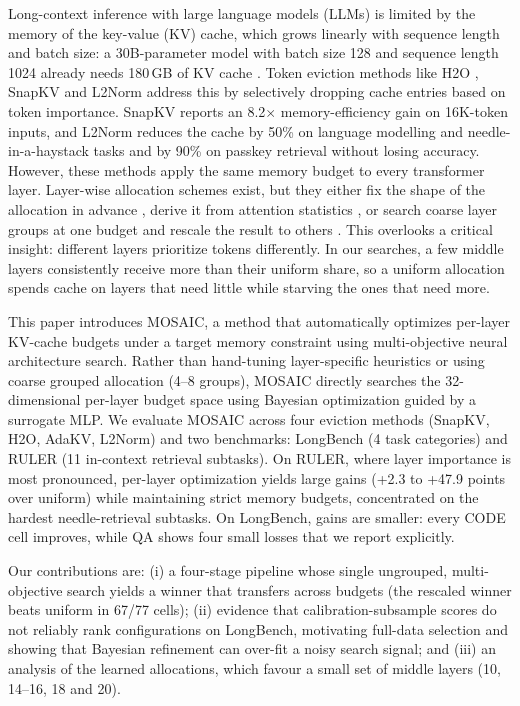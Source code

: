 \documentclass[11pt]{article}
\begin{document}
Long-context inference with large language models (LLMs) is limited by the memory of the key-value (KV) cache, which grows linearly with sequence length and batch size: a 30B-parameter model with batch size 128 and sequence length 1024 already needs 180\,GB of KV cache \citep{zhang2023h2o}. Token eviction methods like H2O \citep{zhang2023h2o}, SnapKV \citep{li2024snapkv} and L2Norm \citep{devoto2024l2norm} address this by selectively dropping cache entries based on token importance. SnapKV reports an 8.2$\times$ memory-efficiency gain on 16K-token inputs, and L2Norm reduces the cache by 50\% on language modelling and needle-in-a-haystack tasks and by 90\% on passkey retrieval without losing accuracy. However, these methods apply the same memory budget to every transformer layer. Layer-wise allocation schemes exist, but they either fix the shape of the allocation in advance \citep{cai2025pyramidkv}, derive it from attention statistics \citep{qin2025cake}, or search coarse layer groups at one budget and rescale the result to others \citep{yu2025evolkv}. This overlooks a critical insight: different layers prioritize tokens differently. In our searches, a few middle layers consistently receive more than their uniform share, so a uniform allocation spends cache on layers that need little while starving the ones that need more.

This paper introduces MOSAIC, a method that automatically optimizes per-layer KV-cache budgets under a target memory constraint using multi-objective neural architecture search. Rather than hand-tuning layer-specific heuristics or using coarse grouped allocation (4–8 groups), MOSAIC directly searches the 32-dimensional per-layer budget space using Bayesian optimization guided by a surrogate MLP. We evaluate MOSAIC across four eviction methods (SnapKV, H2O, AdaKV, L2Norm) and two benchmarks: LongBench (4 task categories) and RULER (11 in-context retrieval subtasks). On RULER, where layer importance is most pronounced, per-layer optimization yields large gains (+2.3 to +47.9 points over uniform) while maintaining strict memory budgets, concentrated on the hardest needle-retrieval subtasks. On LongBench, gains are smaller: every CODE cell improves, while QA shows four small losses that we report explicitly.

Our contributions are: (i) a four-stage pipeline whose single ungrouped, multi-objective search yields a winner that transfers across budgets (the rescaled winner beats uniform in 67/77 cells); (ii) evidence that calibration-subsample scores do not reliably rank configurations on LongBench, motivating full-data selection and showing that Bayesian refinement can over-fit a noisy search signal; and (iii) an analysis of the learned allocations, which favour a small set of middle layers (10, 14--16, 18 and 20).
\end{document}
